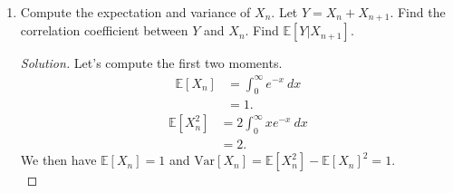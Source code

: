 \documentclass[11pt,letterpaper]{report}
\newcommand{\E}{\mathbb{E}}
\newcommand{\Var}{\text{Var}}
\newenvironment{solution}
{\begin{proof}[Solution]}
{\end{proof}}
\begin{document}
\begin{enumerate}
\begin{enumerate}
\begin{proof}
			\noindent Since any real number is a limit of rational numbers, we obtain $F(ra)= F(a)^{r}$ for any real $r$ by continuity. Since this holds for any $a\geq 0$, we can set $a=1$ to obtain $F(r) = F(1)^r$, so $F$, the distribution of $\tau$, is exponential.
		\end{proof}

		\item Compute the expectation and variance of $X_n$. Let $Y = X_n + X_{n+1}$. Find the correlation coefficient between $Y$ and $X_n$. Find $\E[Y|X_{n+1}]$.
		\begin{solution}
			Let's compute the first two moments.
			\begin{align*}
				\E[X_n] &= \int_0^\infty e^{-x}\ dx\\
				&= 1.
			\end{align*}
			\begin{align*}
				\E[X_n^2] &= 2\int_0^\infty xe^{-x}\ dx\\
				&= 2.
			\end{align*}
			We then have $\E[X_n] = 1$ and $\Var[X_n] = \E[X_n^2] -\E[X_n]^2 = 1$.\\


\end{solution}
\end{enumerate}
\end{enumerate}
\end{document}
